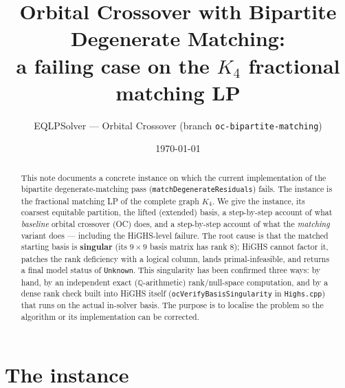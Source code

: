 \documentclass[11pt]{article}
\title{Orbital Crossover with Bipartite Degenerate Matching:\\
a failing case on the $K_4$ fractional matching LP}
\author{EQLPSolver --- Orbital Crossover (branch \texttt{oc-bipartite-matching})}
\date{\today}
\begin{document}
\maketitle

\begin{abstract}
This note documents a concrete instance on which the current implementation of
the bipartite degenerate-matching pass (\texttt{matchDegenerateResiduals}) fails.
The instance is the fractional matching LP of the complete graph $K_4$. We give
the instance, its coarsest equitable partition, the lifted (extended) basis, a
step-by-step account of what \emph{baseline} orbital crossover (OC) does, and a
step-by-step account of what the \emph{matching} variant does --- including the
HiGHS-level failure. The root cause is that the matched starting basis is
\textbf{singular} (its $9\times9$ basis matrix has rank $8$); HiGHS cannot factor
it, patches the rank deficiency with a logical column, lands primal-infeasible,
and returns a final model status of \texttt{Unknown}. This singularity has been
confirmed three ways: by hand, by an independent exact ($\mathbb{Q}$-arithmetic)
rank/null-space computation, and by a dense rank check built into HiGHS itself
(\texttt{ocVerifyBasisSingularity} in \texttt{Highs.cpp}) that runs on the actual
in-solver basis. The purpose is to localise the problem so the algorithm or its
implementation can be corrected.
\end{abstract}

\section{The instance}
\end{document}
